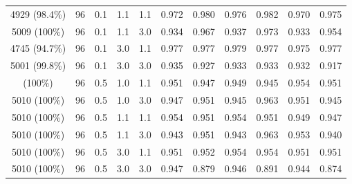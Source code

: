 \begin{longtable}[t]{cccccrrrrrr}
4929 (98.4\%) & 96 & 0.1 & 1.1 & 1.1 & 0.972 & 0.980 & 0.976 & 0.982 & 0.970 & 0.975\\
5009 (100\%) & 96 & 0.1 & 1.1 & 3.0 & 0.934 & 0.967 & 0.937 & 0.973 & 0.933 & 0.954\\
4745 (94.7\%) & 96 & 0.1 & 3.0 & 1.1 & 0.977 & 0.977 & 0.979 & 0.977 & 0.975 & 0.977\\
5001 (99.8\%) & 96 & 0.1 & 3.0 & 3.0 & 0.935 & 0.927 & 0.933 & 0.933 & 0.932 & 0.917\\
\addlinespace
5010 (100\%) & 96 & 0.5 & 1.0 & 1.1 & 0.951 & 0.947 & 0.949 & 0.945 & 0.954 & 0.951\\
5010 (100\%) & 96 & 0.5 & 1.0 & 3.0 & 0.947 & 0.951 & 0.945 & 0.963 & 0.951 & 0.945\\
5010 (100\%) & 96 & 0.5 & 1.1 & 1.1 & 0.954 & 0.951 & 0.954 & 0.951 & 0.949 & 0.947\\
5010 (100\%) & 96 & 0.5 & 1.1 & 3.0 & 0.943 & 0.951 & 0.943 & 0.963 & 0.953 & 0.940\\
5010 (100\%) & 96 & 0.5 & 3.0 & 1.1 & 0.951 & 0.952 & 0.954 & 0.954 & 0.951 & 0.951\\
5010 (100\%) & 96 & 0.5 & 3.0 & 3.0 & 0.947 & 0.879 & 0.946 & 0.891 & 0.944 & 0.874\\
\bottomrule
\end{longtable}
\endgroup{}

